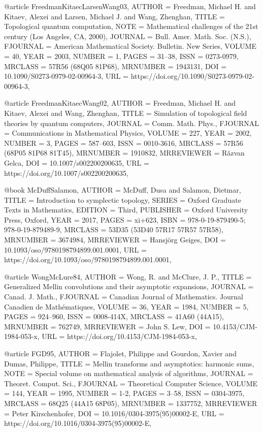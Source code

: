 @article {FreedmanKitaecLarsenWang03,
    AUTHOR = {Freedman, Michael H. and Kitaev, Alexei and Larsen, Michael J.
              and Wang, Zhenghan},
     TITLE = {Topological quantum computation},
      NOTE = {Mathematical challenges of the 21st century (Los Angeles, CA,
              2000)},
   JOURNAL = {Bull. Amer. Math. Soc. (N.S.)},
  FJOURNAL = {American Mathematical Society. Bulletin. New Series},
    VOLUME = {40},
      YEAR = {2003},
    NUMBER = {1},
     PAGES = {31--38},
      ISSN = {0273-0979},
   MRCLASS = {57R56 (68Q05 81P68)},
  MRNUMBER = {1943131},
       DOI = {10.1090/S0273-0979-02-00964-3},
       URL = {https://doi.org/10.1090/S0273-0979-02-00964-3},
}

@article {FreedmanKitaecWang02,
    AUTHOR = {Freedman, Michael H. and Kitaev, Alexei and Wang, Zhenghan},
     TITLE = {Simulation of topological field theories by quantum computers},
   JOURNAL = {Comm. Math. Phys.},
  FJOURNAL = {Communications in Mathematical Physics},
    VOLUME = {227},
      YEAR = {2002},
    NUMBER = {3},
     PAGES = {587--603},
      ISSN = {0010-3616},
   MRCLASS = {57R56 (68P05 81P68 81T45)},
  MRNUMBER = {1910832},
MRREVIEWER = {R\u{a}zvan Gelca},
       DOI = {10.1007/s002200200635},
       URL = {https://doi.org/10.1007/s002200200635},
}


@book {McDuffSalamon,
    AUTHOR = {McDuff, Dusa and Salamon, Dietmar},
     TITLE = {Introduction to symplectic topology},
    SERIES = {Oxford Graduate Texts in Mathematics},
   EDITION = {Third},
 PUBLISHER = {Oxford University Press, Oxford},
      YEAR = {2017},
     PAGES = {xi+623},
      ISBN = {978-0-19-879490-5; 978-0-19-879489-9},
   MRCLASS = {53D35 (53D40 57R17 57R57 57R58)},
  MRNUMBER = {3674984},
MRREVIEWER = {Hansj\"{o}rg Geiges},
       DOI = {10.1093/oso/9780198794899.001.0001},
       URL = {https://doi.org/10.1093/oso/9780198794899.001.0001},
}

@article {WongMcLure84,
    AUTHOR = {Wong, R. and McClure, J. P.},
     TITLE = {Generalized {M}ellin convolutions and their asymptotic
              expansions},
   JOURNAL = {Canad. J. Math.},
  FJOURNAL = {Canadian Journal of Mathematics. Journal Canadien de
              Math\'{e}matiques},
    VOLUME = {36},
      YEAR = {1984},
    NUMBER = {5},
     PAGES = {924--960},
      ISSN = {0008-414X},
   MRCLASS = {41A60 (44A15)},
  MRNUMBER = {762749},
MRREVIEWER = {John S. Lew},
       DOI = {10.4153/CJM-1984-053-x},
       URL = {https://doi.org/10.4153/CJM-1984-053-x},
}

@article {FGD95,
    AUTHOR = {Flajolet, Philippe and Gourdon, Xavier and Dumas, Philippe},
     TITLE = {Mellin transforms and asymptotics: harmonic sums},
      NOTE = {Special volume on mathematical analysis of algorithms},
   JOURNAL = {Theoret. Comput. Sci.},
  FJOURNAL = {Theoretical Computer Science},
    VOLUME = {144},
      YEAR = {1995},
    NUMBER = {1-2},
     PAGES = {3--58},
      ISSN = {0304-3975},
   MRCLASS = {68Q25 (44A15 68P05)},
  MRNUMBER = {1337752},
MRREVIEWER = {Peter Kirschenhofer},
       DOI = {10.1016/0304-3975(95)00002-E},
       URL = {https://doi.org/10.1016/0304-3975(95)00002-E},
}

